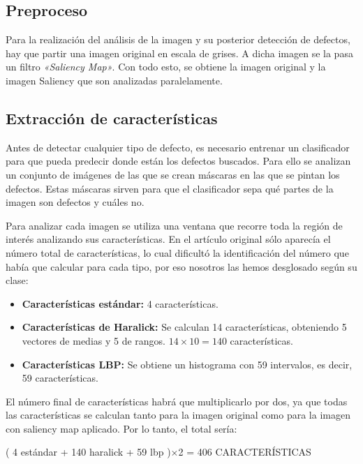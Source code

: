 \subsection{Preproceso}
Para la realización del análisis de la imagen y su posterior detección de defectos, hay que partir una imagen original en escala de grises. A dicha imagen se la pasa un filtro \textit{«Saliency Map»}. Con todo esto, se obtiene la imagen original y la imagen Saliency que son analizadas paralelamente.


\subsection{Extracción de características}
Antes de detectar cualquier tipo de defecto, es necesario entrenar un clasificador para que pueda predecir donde están los defectos buscados. Para ello se analizan un conjunto de imágenes de las que se crean máscaras en las que se pintan los defectos. Estas máscaras sirven para que el clasificador sepa qué partes de la imagen son defectos y cuáles no.

Para analizar cada imagen se utiliza una ventana que recorre toda la región de interés analizando sus características. En el artículo original sólo aparecía el número total de características, lo cual dificultó la identificación del número que había que calcular para cada tipo, por eso nosotros las hemos desglosado según su clase:

\begin{itemize}
\item \textbf{Características estándar:} 4 características.
\item \textbf{Características de Haralick:} Se calculan 14 características, obteniendo 5 vectores de medias
y 5 de rangos. $14 \times 10 = 140$ características.
\item \textbf{Características LBP:} Se obtiene un histograma con 59 intervalos, es decir, 59 características.
\end{itemize}

El número final de características habrá que multiplicarlo por dos, ya que todas las características se calculan tanto para la imagen original como para la imagen con saliency map aplicado. Por lo tanto, el total sería:

( 4 estándar + 140 haralick + 59 lbp )$\times$2 = 406 CARACTERÍSTICAS

